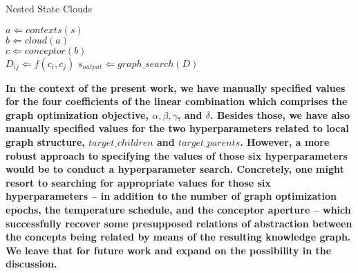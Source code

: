 \begin{algorithm}[!tbp] 
    \caption{Nested State Clouds}
    \label{alg:gs}
    \begin{algorithmic}
            \STATE $a \Leftarrow contexts(s)$ \\
            \STATE $b \Leftarrow cloud(a)$ \\
            \STATE $c \Leftarrow conceptor(b)$ \\
        \ENDFOR
                \STATE $D_{ij} \Leftarrow f(c_i, c_j)$
            \ENDFOR
        \ENDFOR
        \STATE $s_{output} \Leftarrow graph\_search(D)$
    \end{algorithmic}
\end{algorithm}

\textbf{In the context of the present work, we have manually specified values for the four coefficients of the linear combination which comprises the graph optimization objective, $\alpha, \beta, \gamma$, and $\delta$. Besides those, we have also manually specified values for the two hyperparameters related to local graph structure, $target\_children$ and $target\_parents$. However, a more robust approach to specifying the values of those six hyperparameters would be to conduct a hyperparameter search. Concretely, one might resort to searching for appropriate values for those six hyperparameters -- in addition to the number of graph optimization epochs, the temperature schedule, and the conceptor aperture -- which successfully recover some presupposed relations of abstraction between the concepts being related by means of the resulting knowledge graph. We leave that for future work and expand on the possibility in the discussion.}